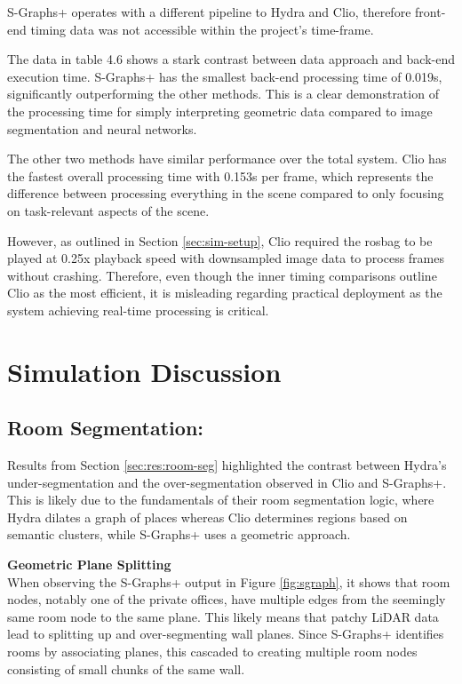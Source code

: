 S-Graphs+ operates with a different pipeline to Hydra and Clio, therefore front-end timing data was not accessible within the project’s time-frame.

The data in table 4.6 shows a stark contrast between data approach and back-end execution time. S-Graphs+ has the smallest back-end processing time of 0.019s, significantly outperforming the other methods. This is a clear demonstration of the processing time for simply interpreting geometric data compared to image segmentation and neural networks.

The other two methods have similar performance over the total system. Clio has the fastest overall processing time with 0.153s per frame, which represents the difference between processing everything in the scene compared to only focusing on task-relevant aspects of the scene.

However, as outlined in Section \ref{sec:sim-setup}, Clio required the rosbag to be played at 0.25x playback speed with downsampled image data to process frames without crashing. Therefore, even though the inner timing comparisons outline Clio as the most efficient, it is misleading regarding practical deployment as the system achieving real-time processing is critical.


\section{Simulation Discussion}\label{sec:sim-discussion}

\subsection{Room Segmentation:}\label{sec:disc-room-seg}

Results from Section \ref{sec:res:room-seg} highlighted the contrast between Hydra’s under-segmentation and the over-segmentation observed in Clio and S-Graphs+. This is likely due to the fundamentals of their room segmentation logic, where Hydra dilates a graph of places whereas Clio determines regions based on semantic clusters, while S-Graphs+ uses a geometric approach.


\noindent \textbf{Geometric Plane Splitting} \\
When observing the S-Graphs+ output in Figure \ref{fig:sgraph}, it shows that room nodes, notably one of the private offices, have multiple edges from the seemingly same room node to the same plane. This likely means that patchy LiDAR data lead to splitting up and over-segmenting wall planes. Since S-Graphs+ identifies rooms by associating planes, this cascaded to creating multiple room nodes consisting of small chunks of the same wall.


